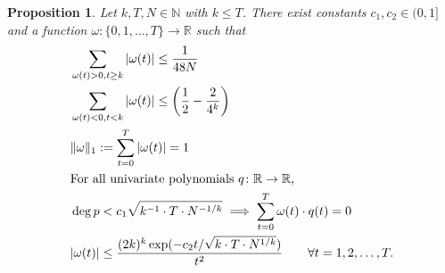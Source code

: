 \documentclass[11pt, letterpaper, fleqn]{article}
\newtheorem{proposition}[theorem]{Proposition}
\theoremstyle{plain}
\newcommand{\R}{\mathbb{R}}
\newcommand{\N}{\mathbb{N}}
\begin{document}
\begin{proposition} \label{prop:thr-sym-dual}
Let $k, T, N \in \N$ with $k \le T$. There exist constants $c_1, c_2 \in (0, 1] $ and a function $\omega : \{0, 1, \dots, T\} \to \R$ such that
\begin{align} & \sum_{\omega(t) > 0, t \ge k} |\omega(t)| \le \frac{1}{48N}  \label{eqn:thr-sym-pos-corr} \\
& \sum_{\omega(t) < 0, t < k} |\omega(t)| \le \left(\frac{1}{2} - \frac{2}{4^k}\right)\label{eqn:thr-sym-neg-corr} \\
& \|\omega\|_1 := \sum_{t = 0}^{T} |\omega(t)| = 1 \label{eqn:thr-sym-norm} \\
& \text{For all univariate polynomials } q \colon \R \to \R\text{, } \notag \\
& \deg p < c_1\sqrt{k^{-1} \cdot T \cdot N^{-1/k}} \implies \sum_{t=0}^T \omega(t) \cdot q(t) = 0 \label{eqn:thr-sym-phd} \\
&  |\omega(t)| \le \frac{(2k)^k \exp(-c_2 t / \sqrt{k \cdot T \cdot N^{1/k}})}{t^2} \qquad \forall t = 1, 2, \dots, T.\label{eqn:thr-sym-decay}
\end{align}
\end{proposition}
\end{document}
